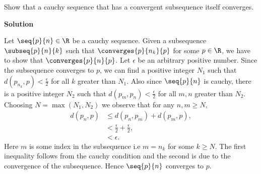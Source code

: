 \documentclass[11pt]{amstext-l}
\newcommand{\solution}{\textbf{\large Solution}}
\begin{document}
\pagebreak
\begin{homeworkProblem}[6]
    Show that a cauchy sequence that has a convergent subsequence itself converges.

    \solution{}

    Let $\seq{p}{n} \in \R$ be a cauchy sequence. Given a subsequence $\subseq{p}{n}{k}$ such
    that $\converges{p}{n_k}{p}$ for some $p \in \R$, we have to show that $\converges{p}{n}{p}$.
    Let $\epsilon$ be an arbitrary positive number. Since the subsequence converges to $p$, we can
    find a positive integer $N_1$ such that $d(p_{n_k},p) < \frac{\epsilon}{2}$ for all $k$ 
    greater than $N_1$. Also since $\seq{p}{n}$ is cauchy, there is a positive integer $N_2$ 
    such that $d(p_m,p_n) < \frac{\epsilon}{2}$ for all $m,n$ greater than $N_2$. 
    Choosing $N = \max(N_1,N_2)$ we observe that for any $n,m \geq N$,
    \begin{align*}
	d(p_n,p) &\leq d(p_n,p_m) + d(p_m,p), \\
	&< \frac{\epsilon}{2} + \frac{\epsilon}{2}, \\
	&< \epsilon.
    \end{align*}
    Here $m$ is some index in the subsequence i.e $m = n_k$ for some $k \geq N$. The first inequality
    follows from the cauchy condition and the second is due to the convergence
    of the subsequence. Hence $\seq{p}{n}$ converges to $p$.

\end{homeworkProblem}
\end{document}
